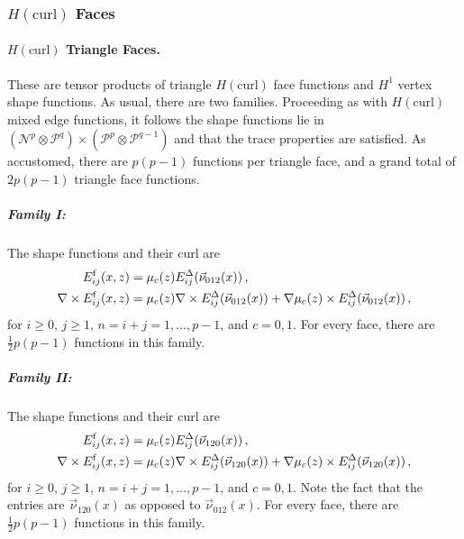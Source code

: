 \subsubsection{\texorpdfstring{$H(\mathrm{curl})$}{Hcurl} Faces}

\paragraph{\texorpdfstring{$H(\mathrm{curl})$}{Hcurl} Triangle Faces.} 
These are tensor products of triangle $H(\text{curl})$ face functions and $H^1$ vertex shape functions. 
As usual, there are two families. 
Proceeding as with $H(\text{curl})$ mixed edge functions, it follows the shape functions lie in $(\mathcal{N}^p\otimes\mathcal{P}^q)\times(\mathcal{P}^p\otimes\mathcal{P}^{q-1})$ and that the trace properties are satisfied.
As accustomed, there are $p(p-1)$ functions per triangle face, and a grand total of $2p(p-1)$ triangle face functions.

\subparagraph{Family I:} 
The shape functions and their curl are
\begin{equation}
	\begin{aligned}
		E_{ij}^{\mathrm{f}}(x,z)&=\mu_c(z)E_{ij}^\Delta(\vec{\nu}_{012}(x))\,,\\
		\nabla\times E_{ij}^{\mathrm{f}}(x,z)&=\mu_c(z)\nabla\times E_{ij}^\Delta(\vec{\nu}_{012}(x))
			+\nabla\mu_c(z)\times E_{ij}^\Delta(\vec{\nu}_{012}(x))\,,
	\end{aligned}
\end{equation}
for $i\geq0$, $j\geq1$, $n=i+j=1,\ldots,p-1$, and $c=0,1$. 
For every face, there are $\frac{1}{2}p(p-1)$ functions in this family.

\subparagraph{Family II:}
The shape functions and their curl are
\begin{equation}
	\begin{aligned}
		E_{ij}^{\mathrm{f}}(x,z)&=\mu_c(z)E_{ij}^\Delta(\vec{\nu}_{120}(x))\,,\\
		\nabla\times E_{ij}^{\mathrm{f}}(x,z)&=\mu_c(z)\nabla\times E_{ij}^\Delta(\vec{\nu}_{120}(x))
			+\nabla\mu_c(z)\times E_{ij}^\Delta(\vec{\nu}_{120}(x))\,,
	\end{aligned}
\end{equation}
for $i\geq0$, $j\geq1$, $n=i+j=1,\ldots,p-1$, and $c=0,1$.
Note the fact that the entries are $\vec{\nu}_{120}(x)$ as opposed to $\vec{\nu}_{012}(x)$.
For every face, there are $\frac{1}{2}p(p-1)$ functions in this family.


